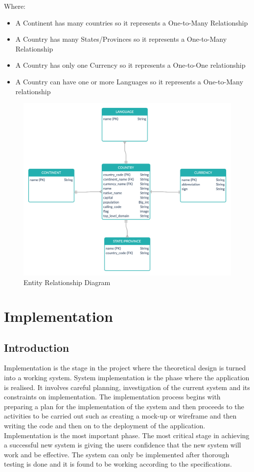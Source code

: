 \documentclass[twoside, a4paper, 12pt]{report}
\begin{document}
Where:
\begin{itemize}
	\item A Continent has many countries so it represents a One-to-Many Relationship
	\item A Country has many States/Provinces so it represents a One-to-Many Relationship
	\item A Country has only one Currency so it represents a One-to-One relationship
	\item A Country can have one or more Languages so it represents a One-to-Many relationship
\end{itemize}

\begin{figure} [ht]
	\centering
	\includegraphics[width=1.0\textwidth]{ERD.png}
	\caption{Entity Relationship Diagram}
	\label{fig:ERD}
\end{figure}

\chapter{Implementation}
\section{Introduction}
Implementation is the stage in the project where the theoretical design is turned into a working system. System implementation is the phase where the application is realised. It involves careful planning, investigation of the current system and its constraints on implementation. The implementation process begins with preparing a plan for the implementation of the system and then proceeds to the activities to be carried out such as creating a mock-up or wireframe and then writing the code and then on to the deployment of the application.\\
\indent
Implementation is the most important phase. The most critical stage in achieving a successful new system is giving the users confidence that the new system will work and be effective. The system can only be implemented after thorough testing is done and it is found to be working according to the specifications.
\end{document}

